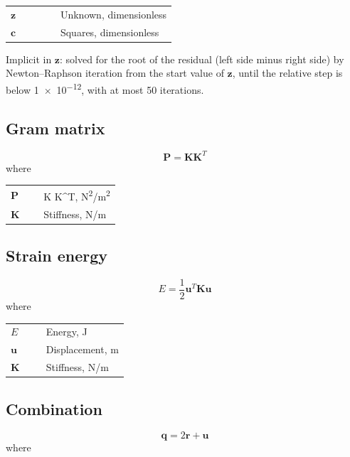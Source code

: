 \documentclass[11pt,a4paper]{article}
\begin{document}
\noindent\begin{tabular}{@{\quad}l@{\quad}p{0.7\linewidth}@{}}
  $\mathbf{z}$ & Unknown, dimensionless \\
  $\mathbf{c}$ & Squares, dimensionless \\
\end{tabular}

\noindent Implicit in $\mathbf{z}$: solved for the root of the residual (left side minus right side) by Newton–Raphson iteration from the start value of $\mathbf{z}$, until the relative step is below \num{1e-12}, with at most 50 iterations.

\subsection{Gram matrix}
\begin{equation}
  \mathbf{P} = \mathbf{K}\mathbf{K}^T
  \label{eq:gram-matrix}
\end{equation}
\noindent where

\noindent\begin{tabular}{@{\quad}l@{\quad}p{0.7\linewidth}@{}}
  $\mathbf{P}$ & K K\textasciicircum{}T, \si{N^{2}/m^{2}} \\
  $\mathbf{K}$ & Stiffness, \si{N/m} \\
\end{tabular}


\subsection{Strain energy}
\begin{equation}
  E = \frac{1}{2}\mathbf{u}^T\mathbf{K}\mathbf{u}
  \label{eq:strain-energy}
\end{equation}
\noindent where

\noindent\begin{tabular}{@{\quad}l@{\quad}p{0.7\linewidth}@{}}
  $E$ & Energy, \si{J} \\
  $\mathbf{u}$ & Displacement, \si{m} \\
  $\mathbf{K}$ & Stiffness, \si{N/m} \\
\end{tabular}


\subsection{Combination}
\begin{equation}
  \mathbf{q} = 2 \mathbf{r} + \mathbf{u}
  \label{eq:combination}
\end{equation}
\noindent where
\end{document}
